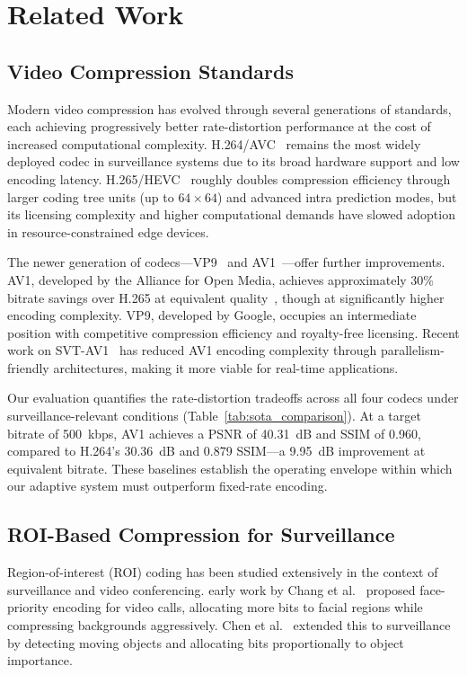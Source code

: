 \section{Related Work}
\label{sec:related_work}

\subsection{Video Compression Standards}

Modern video compression has evolved through several generations of standards, each achieving progressively better rate-distortion performance at the cost of increased computational complexity. H.264/AVC~\cite{wiegand2003h264} remains the most widely deployed codec in surveillance systems due to its broad hardware support and low encoding latency. H.265/HEVC~\cite{sullivan2012h265} roughly doubles compression efficiency through larger coding tree units (up to $64\times64$) and advanced intra prediction modes, but its licensing complexity and higher computational demands have slowed adoption in resource-constrained edge devices.

The newer generation of codecs---VP9~\cite{grange2017vp9} and AV1~\cite{chen2021av1}---offer further improvements. AV1, developed by the Alliance for Open Media, achieves approximately 30\% bitrate savings over H.265 at equivalent quality~\cite{chen2021av1}, though at significantly higher encoding complexity. VP9, developed by Google, occupies an intermediate position with competitive compression efficiency and royalty-free licensing. Recent work on SVT-AV1~\cite{chen2022svtav1} has reduced AV1 encoding complexity through parallelism-friendly architectures, making it more viable for real-time applications.

Our evaluation quantifies the rate-distortion tradeoffs across all four codecs under surveillance-relevant conditions (Table~\ref{tab:sota_comparison}). At a target bitrate of 500~kbps, AV1 achieves a PSNR of 40.31~dB and SSIM of 0.960, compared to H.264's 30.36~dB and 0.879 SSIM---a 9.95~dB improvement at equivalent bitrate. These baselines establish the operating envelope within which our adaptive system must outperform fixed-rate encoding.

\subsection{ROI-Based Compression for Surveillance}

Region-of-interest (ROI) coding has been studied extensively in the context of surveillance and video conferencing. early work by Chang et al.~\cite{chang2004roi} proposed face-priority encoding for video calls, allocating more bits to facial regions while compressing backgrounds aggressively. Chen et al.~\cite{chen2008roi} extended this to surveillance by detecting moving objects and allocating bits proportionally to object importance.

